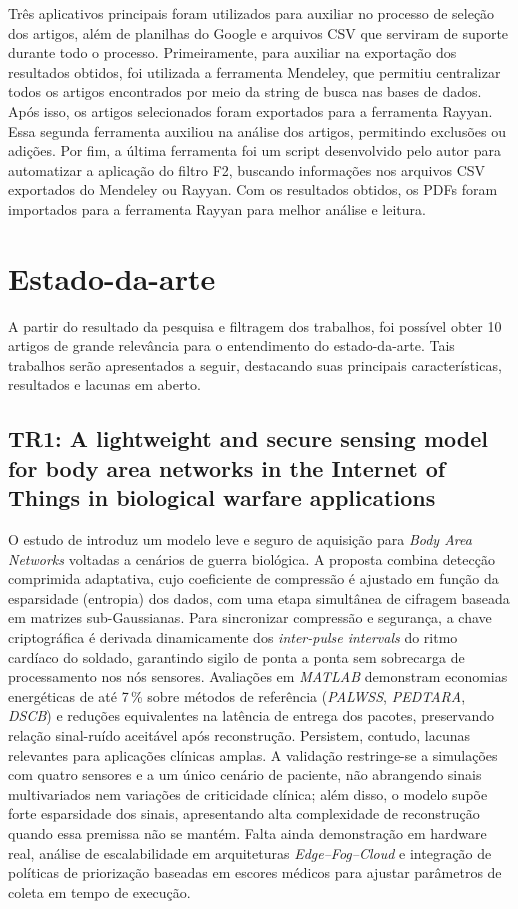 \documentclass[twoside,english,brazilian]{UNISINOSmonografia}
\begin{document}
Três aplicativos principais foram utilizados para auxiliar no processo de seleção dos artigos, além de planilhas do Google e arquivos CSV que serviram de suporte durante todo o processo. Primeiramente, para auxiliar na exportação dos resultados obtidos, foi utilizada a ferramenta Mendeley, que permitiu centralizar todos os artigos encontrados por meio da string de busca nas bases de dados. Após isso, os artigos selecionados foram exportados para a ferramenta Rayyan. Essa segunda ferramenta auxiliou na análise dos artigos, permitindo exclusões ou adições. Por fim, a última ferramenta foi um script desenvolvido pelo autor para automatizar a aplicação do filtro F2, buscando informações nos arquivos CSV exportados do Mendeley ou Rayyan. Com os resultados obtidos, os PDFs foram importados para a ferramenta Rayyan para melhor análise e leitura.

\section{Estado-da-arte}
\label{sec:state-art}

A partir do resultado da pesquisa e filtragem dos trabalhos, foi possível obter 10 artigos de grande relevância para o entendimento do estado-da-arte. Tais trabalhos serão apresentados a seguir, destacando suas principais características, resultados e lacunas em aberto.

\subsection{TR1: A lightweight and secure sensing model for body area networks in the Internet of Things in biological warfare applications \cite{ESMAEILI2023}}
O estudo de \cite{ESMAEILI2023} introduz um modelo leve e seguro de aquisição para \textit{Body Area Networks} voltadas a cenários de guerra biológica. A proposta combina detecção comprimida adaptativa, cujo coeficiente de compressão é ajustado em função da esparsidade (entropia) dos dados, com uma etapa simultânea de cifragem baseada em matrizes sub-Gaussianas. Para sincronizar compressão e segurança, a chave criptográfica é derivada dinamicamente dos \textit{inter-pulse intervals} do ritmo cardíaco do soldado, garantindo sigilo de ponta a ponta sem sobrecarga de processamento nos nós sensores. Avaliações em \textit{MATLAB} demonstram economias energéticas de até 7\,\% sobre métodos de referência (\textit{PALWSS}, \textit{PEDTARA}, \textit{DSCB}) e reduções equivalentes na latência de entrega dos pacotes, preservando relação sinal-ruído aceitável após reconstrução. Persistem, contudo, lacunas relevantes para aplicações clínicas amplas. A validação restringe-se a simulações com quatro sensores e a um único cenário de paciente, não abrangendo sinais multivariados nem variações de criticidade clínica; além disso, o modelo supõe forte esparsidade dos sinais, apresentando alta complexidade de reconstrução quando essa premissa não se mantém. Falta ainda demonstração em hardware real, análise de escalabilidade em arquiteturas \textit{Edge–Fog–Cloud} e integração de políticas de priorização baseadas em escores médicos para ajustar parâmetros de coleta em tempo de execução.
\end{document}
